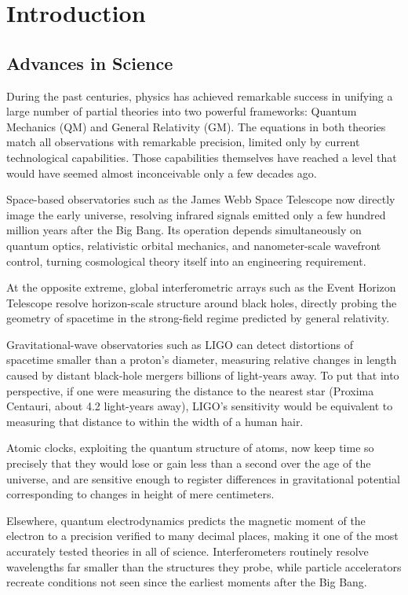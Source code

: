 \chapter{Introduction}

\section{Advances in Science}

During the past centuries, physics has achieved remarkable success in unifying a large number of partial theories into two powerful frameworks: Quantum Mechanics (QM) and General Relativity (GM). The equations in both theories match all observations with remarkable precision, limited only by current technological capabilities. Those capabilities themselves have reached a level that would have seemed almost inconceivable only a few decades ago.

Space-based observatories such as the James Webb Space Telescope now directly image the early universe,
resolving infrared signals emitted only a few hundred million years after the Big Bang. Its operation
depends simultaneously on quantum optics, relativistic orbital mechanics, and nanometer-scale wavefront
control, turning cosmological theory itself into an engineering requirement.

At the opposite extreme, global interferometric arrays such as the Event Horizon Telescope resolve
horizon-scale structure around black holes, directly probing the geometry of spacetime in the
strong-field regime predicted by general relativity.

Gravitational-wave observatories such as LIGO can detect distortions of spacetime smaller than a proton’s diameter, measuring relative changes in length caused by distant black-hole mergers billions of light-years away. To put that into perspective, if one were measuring the distance to the nearest star (Proxima Centauri, about 4.2 light-years away), LIGO’s sensitivity would be equivalent to measuring that distance to within the width of a human hair.

Atomic clocks, exploiting the quantum structure of atoms, now keep time so precisely that they would lose or gain less than a second over the age of the universe, and are sensitive enough to register differences in gravitational potential corresponding to changes in height of mere centimeters.

Elsewhere, quantum electrodynamics predicts the magnetic moment of the electron to a precision verified to many decimal places, making it one of the most accurately tested theories in all of science. Interferometers routinely resolve wavelengths far smaller than the structures they probe, while particle accelerators recreate conditions not seen since the earliest moments after the Big Bang. 

